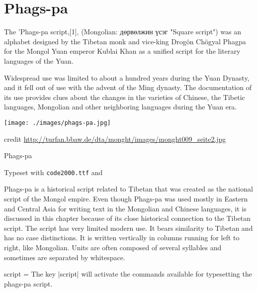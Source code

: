 \section{Phags-pa}
\label{s:phagspa}
\newfontfamily{}
\arial 
The 'Phags-pa script,[1], (Mongolian: дөрвөлжин үсэг "Square script") was an alphabet designed by the Tibetan monk and vice-king Drogön Chögyal Phagpa for the Mongol Yuan emperor Kublai Khan as a unified script for the literary languages of the Yuan.

Widespread use was limited to about a hundred years during the Yuan Dynasty, and it fell out of use with the advent of the Ming dynasty. The documentation of its use provides clues about the changes in the varieties of Chinese, the Tibetic languages, Mongolian and other neighboring languages during the Yuan era.
\medskip


\texttt{[image: ./images/phags-pa.jpg]}

credit \protect\url{http://turfan.bbaw.de/dta/monght/images/monght009_seite2.jpg}



\begin{scriptexample}[]{Phags-pa}
\bgroup
{}

\arial
\hfill Typeset with \texttt{code2000.ttf} and \cmd{\phagspa}

\egroup
\end{scriptexample}
\medskip

Phags-pa is a historical script related to Tibetan that was created as the national script of
the Mongol empire. Even though Phags-pa was used mostly in Eastern and Central Asia for
writing text in the Mongolian and Chinese languages, it is discussed in this chapter because
of its close historical connection to the Tibetan script. The script has very limited modern use. It bears similarity to Tibetan and has no case distinctions. It is written vertically in columns running for left to right, like Mongolian. Units are often composed of several syllables and sometimes are separated by whitespace.




\begin{docKey}[phd]{script}{ = } {}
The key |script| will activate the commands available for typesetting the phags-pa script.
\end{docKey}



